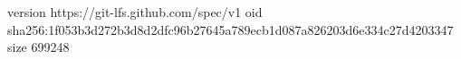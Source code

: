 version https://git-lfs.github.com/spec/v1
oid sha256:1f053b3d272b3d8d2dfc96b27645a789ecb1d087a826203d6e334c27d4203347
size 699248
